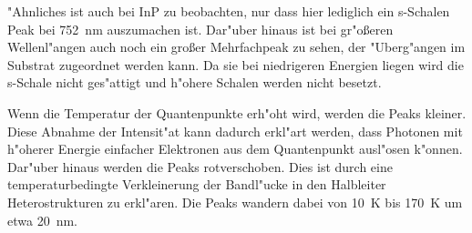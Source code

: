 "Ahnliches ist auch bei InP zu beobachten, nur dass hier lediglich ein s-Schalen Peak bei \SI{752}{nm} auszumachen ist.
Dar"uber hinaus ist bei gr"o{\ss}eren Wellenl"angen auch noch ein gro{\ss}er Mehrfachpeak zu sehen, der "Uberg"angen im Substrat zugeordnet werden kann.
Da sie bei niedrigeren Energien liegen wird die s-Schale nicht ges"attigt und h"ohere Schalen werden nicht besetzt.

Wenn die Temperatur der Quantenpunkte erh"oht wird, werden die Peaks kleiner.
Diese Abnahme der Intensit"at kann dadurch erkl"art werden, dass Photonen mit h"oherer Energie einfacher Elektronen aus dem Quantenpunkt ausl"osen k"onnen.
Dar"uber hinaus werden die Peaks rotverschoben.
Dies ist durch eine temperaturbedingte Verkleinerung der Bandl"ucke in den Halbleiter Heterostrukturen zu erkl"aren.
Die Peaks wandern dabei von \SI{10}{\kelvin} bis \SI{170}{\kelvin} um etwa \SI{20}{\nano\metre}.
